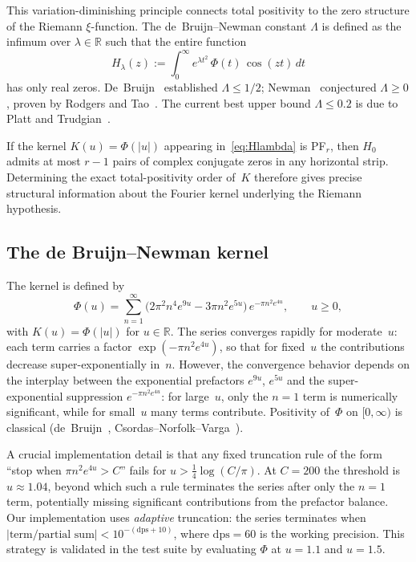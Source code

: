 \documentclass[11pt,a4paper]{amsart}
\theoremstyle{definition}
\theoremstyle{remark}
\newcommand{\R}{\mathbb{R}}
\newcommand{\dps}{\mathrm{dps}}
\begin{document}
This variation-diminishing principle connects total positivity
to the zero structure of the Riemann $\xi$-function.
The de~Bruijn--Newman constant $\Lambda$ is defined as the infimum
over $\lambda \in \R$ such that the entire function
\begin{equation}\label{eq:Hlambda}
  H_\lambda(z) := \int_0^\infty e^{\lambda t^2}\,\Phi(t)\,\cos(zt)\,dt
\end{equation}
has only real zeros.
De~Bruijn~\cite{deBruijn1950} established $\Lambda \le 1/2$;
Newman~\cite{Newman1976} conjectured $\Lambda \ge 0$,
proven by Rodgers and Tao~\cite{RodgersTao2020}.
The current best upper bound $\Lambda \le 0.2$ is due to
Platt and Trudgian~\cite{PlattTrudgian2021}.

If the kernel $K(u) = \Phi(|u|)$ appearing in~\eqref{eq:Hlambda}
is PF$_r$, then $H_0$ admits at most
$r-1$ pairs of complex conjugate zeros in any horizontal strip.
Determining the exact total-positivity order of~$K$ therefore gives
precise structural information about the Fourier kernel underlying
the Riemann hypothesis.

\subsection{The de Bruijn--Newman kernel}

The kernel is defined by
\begin{equation}\label{eq:Phi}
  \Phi(u) = \sum_{n=1}^{\infty}
    \bigl(2\pi^2 n^4 e^{9u} - 3\pi n^2 e^{5u}\bigr)\,
    e^{-\pi n^2 e^{4u}}, \qquad u \ge 0,
\end{equation}
with $K(u) = \Phi(|u|)$ for $u \in \R$.
The series converges rapidly for moderate~$u$: each term carries
a factor $\exp(-\pi n^2 e^{4u})$, so that for fixed~$u$ the
contributions decrease super-exponentially in~$n$.
However, the convergence behavior depends on the interplay between
the exponential prefactors $e^{9u}$, $e^{5u}$ and the
super-exponential suppression $e^{-\pi n^2 e^{4u}}$:
for large~$u$, only the $n=1$ term is numerically significant,
while for small~$u$ many terms contribute.
Positivity of~$\Phi$ on $[0,\infty)$ is classical
(de~Bruijn~\cite{deBruijn1950}, Csordas--Norfolk--Varga~\cite{CNV1986}).

A crucial implementation detail is that any fixed truncation rule
of the form ``stop when $\pi n^2 e^{4u} > C$'' fails for
$u > \frac{1}{4}\log(C/\pi)$.
At $C = 200$ the threshold is $u \approx 1.04$,
beyond which such a rule terminates the series after only
the $n=1$ term, potentially missing significant contributions
from the prefactor balance.
Our implementation uses \emph{adaptive} truncation:
the series terminates when
$|\text{term}/\text{partial sum}| < 10^{-(\dps+10)}$,
where $\dps = 60$ is the working precision.
This strategy is validated in the test suite by evaluating
$\Phi$ at $u = 1.1$ and $u = 1.5$.
\end{document}
